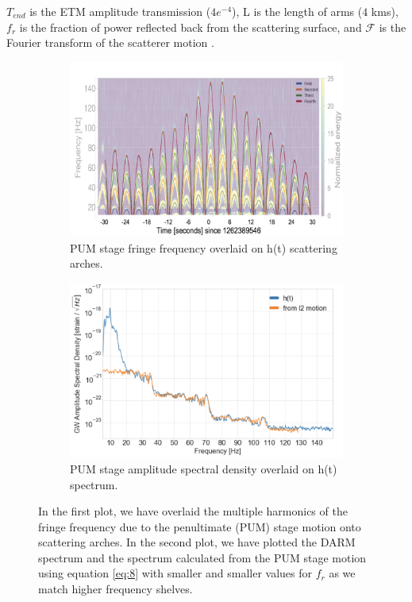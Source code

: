 \documentclass[12pt]{iopart}
\begin{document}
$T_{end}$ is the ETM amplitude transmission ($4e^{-4}$), L is the length of arms ($4$ kms), $f_{r}$ is the fraction of power reflected back from the scattering surface, and $\mathcal{F}$ is the Fourier transform of the scatterer motion \cite{vaj_scat}.
\begin{figure}[h]
\captionsetup[subfigure]{font=scriptsize,labelfont=scriptsize}
   \centering
    \begin{subfigure}[b]{0.45\textwidth}
        \centering
         \includegraphics[width= \textwidth]{fringe_l2c.png}
         \caption{PUM stage fringe frequency overlaid on h(t) scattering arches.}
         \label{fig:fringel2}
    \end{subfigure}
    \hfill
    \begin{subfigure}[b]{0.45\textwidth}
        \centering
         \includegraphics[width =\textwidth]{spectrum_l2new.png}
         \caption{PUM stage amplitude spectral density overlaid on h(t) spectrum.}
         \label{fig:spectruml2}
         
    
    \end{subfigure}
    \caption{In the first plot, we have overlaid the multiple harmonics of the fringe frequency due to the penultimate (PUM) stage motion onto scattering arches. In the second plot, we have plotted the DARM spectrum and the spectrum calculated from the PUM stage motion using equation \ref{eq:8} with smaller and smaller values for $f_{r}$ as we match higher frequency shelves.}
    \label{fig:fringespectrum}
    
\end{figure}
\end{document}
